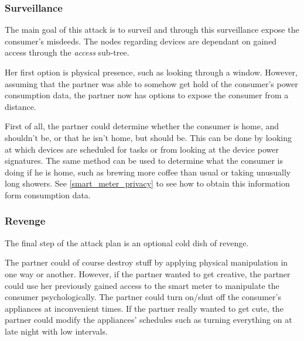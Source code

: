 \subsubsection{Surveillance}
The main goal of this attack is to surveil and through this surveillance expose the consumer's misdeeds.
The nodes regarding devices are dependant on gained access through the \textit{access} sub-tree.

Her first option is physical presence, such as looking through a window.
However, assuming that the partner was able to somehow get hold of the consumer's power consumption data, the partner now has options to expose the consumer from a distance.

First of all, the partner could determine whether the consumer is home, and shouldn't be, or that he isn't home, but should be.
This can be done by looking at which devices are scheduled for tasks or from looking at the device power signatures.
The same method can be used to determine what the consumer is doing if he is home, such as brewing more coffee than usual or taking unusually long showers.
See \cref{smart_meter_privacy} to see how to obtain this information form consumption data.

\subsubsection{Revenge}
The final step of the attack plan is an optional cold dish of revenge.

The partner could of course destroy stuff by applying physical manipulation in one way or another.
However, if the partner wanted to get creative, the partner could use her previously gained access to the smart meter to manipulate the consumer psychologically.
The partner could turn on/shut off the consumer's appliances at inconvenient times.
If the partner really wanted to get cute, the partner could modify the appliances' schedules such as turning everything on at late night with low intervals.
